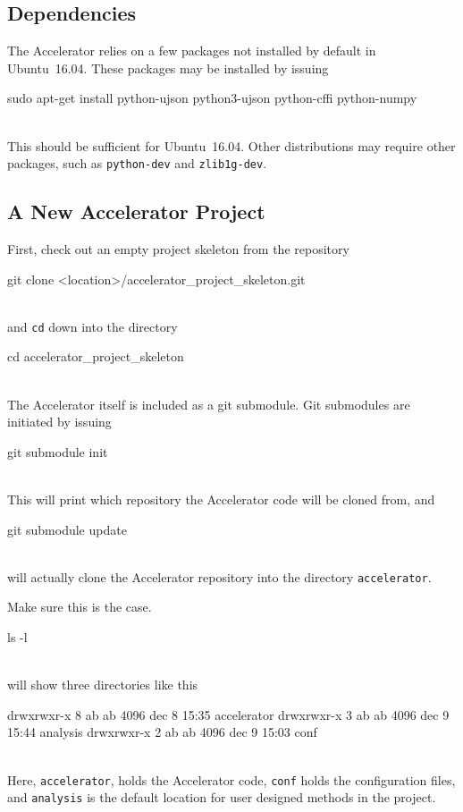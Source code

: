 \documentclass[a4paper]{article}
\begin{document}
\subsection{Dependencies}
The Accelerator relies on a few packages not installed by default in
Ubuntu~16.04.  These packages may be installed by issuing
\\
\begin{shell}
  sudo apt-get install python-ujson python3-ujson python-cffi python-numpy
\end{shell}
\\
This should be sufficient for Ubuntu~16.04.  Other distributions
may require other packages, such as \texttt{python-dev} and
\texttt{zlib1g-dev}.


\subsection{A New Accelerator Project}
First, check out an empty project skeleton from the repository
\\
\begin{shellBEG}
  git clone <location>/accelerator_project_skeleton.git
\end{shellBEG}
\\
and \texttt{cd} down into the directory
\\
\begin{shellMID}
  cd accelerator_project_skeleton
\end{shellMID}
\\
The Accelerator itself is included as a git submodule.  Git submodules
are initiated by issuing
\\
\begin{shellMID}
  git submodule init
\end{shellMID}
\\
This will print which repository the Accelerator code will be cloned
from, and
\\
\begin{shellEND}
  git submodule update
\end{shellEND}
\\
will actually clone the Accelerator repository into the directory
\texttt{accelerator}.

\noindent Make sure this is the case.
\\
\begin{shell}
  ls -l
\end{shell}
\\
will show three directories like this
\\
\begin{text}
drwxrwxr-x 8 ab ab 4096 dec  8 15:35 accelerator
drwxrwxr-x 3 ab ab 4096 dec  9 15:44 analysis
drwxrwxr-x 2 ab ab 4096 dec  9 15:03 conf
\end{text}
\\
Here, \texttt{accelerator},
holds the Accelerator code, \texttt{conf} holds the
configuration files, and \texttt{analysis} is the default location for
user designed methods in the project.
\end{document}
